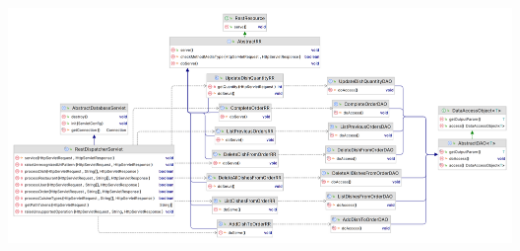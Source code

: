 \begin{center}
    \includegraphics[width=1.0\textwidth]{resources/class-diagrams/order_class_diagram}
    \label{fig:class-order}
\end{center}

\newpage
